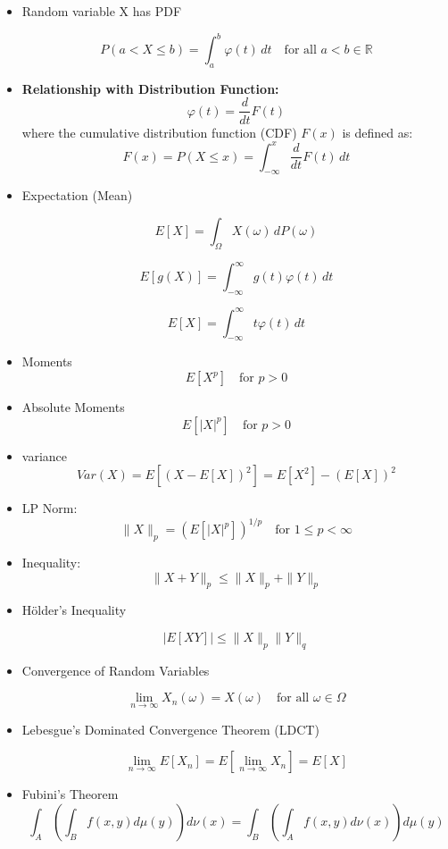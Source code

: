 \documentclass{article}
\begin{document}
\begin{itemize}

\item Random variable X has PDF 

    \[
    P(a < X \leq b) = \int_a^b \varphi(t) \, dt \quad \text{for all } a < b \in \mathbb{R}
    \]

\item \textbf{Relationship with Distribution Function:}
\[
\varphi(t) = \frac{d}{dt} F(t)
\]
where the cumulative distribution function (CDF) \( F(x) \) is defined as:
\[
F(x) = P(X \leq x) = \int_{-\infty}^{x} \frac{d}{dt} F(t) \, dt
\]


\item Expectation (Mean)

 \[
    E[X] = \int_{\Omega} X(\omega) \, dP(\omega)
    \]

\[
        E[g(X)] = \int_{-\infty}^{\infty} g(t) \varphi(t) \, dt
        \]

    \[
    E[X] = \int_{-\infty}^{\infty} t \varphi(t) \, dt
    \]

\item Moments
    \[
    E[X^p] \quad \text{for } p > 0
    \]
\item Absolute Moments
    \[
    E[|X|^p] \quad \text{for } p > 0
    \]

\item variance
    \[
    Var(X) = E[(X - E[X])^2] = E[X^2] - (E[X])^2
    \]

\item LP Norm:
\[
\|X\|_p = (E[|X|^p])^{1/p} \quad \text{for } 1 \leq p < \infty
\]

\item Inequality:
\[
\|X + Y\|_p \leq \|X\|_p + \|Y\|_p
\]

\item Hölder's Inequality

    \[
    |E[XY]| \leq \|X\|_p \|Y\|_q
    \]

\item Convergence of Random Variables

\[
\lim_{n \to \infty} X_n(\omega) = X(\omega) \quad \text{for all } \omega \in \Omega
\]

\item Lebesgue's Dominated Convergence Theorem (LDCT)

\[
\lim_{n \to \infty} E[X_n] = E\left[\lim_{n \to \infty} X_n\right] = E[X]
\]

\item Fubini's Theorem
\[
\int_A \left( \int_B f(x, y) d\mu(y) \right) d\nu(x) = \int_B \left( \int_A f(x, y) d\nu(x) \right) d\mu(y)
\]


\end{itemize}
\end{document}
